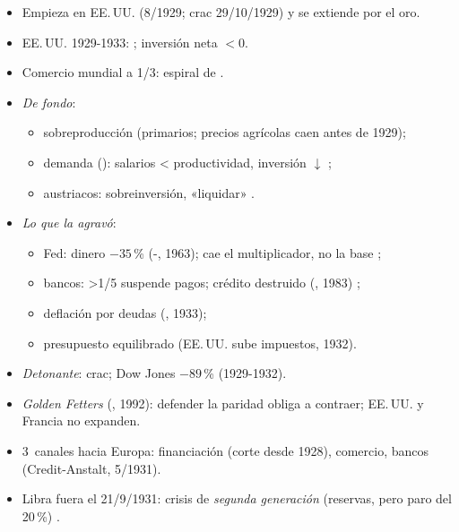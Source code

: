 \documentclass{article}
\begin{document}
\begin{columnas}
\begin{itemize}
\item Empieza en EE.\,UU. (8/1929; crac 29/10/1929) y se extiende por el oro.
\item EE.\,UU. 1929-1933: ; inversión neta $<0$.
\item Comercio mundial a 1/3: espiral de .
\end{itemize}
\begin{itemize}
\item \emph{De fondo}:
  \begin{itemize}
  \item sobreproducción (primarios; precios agrícolas caen antes de 1929);
  \item demanda (): salarios < productividad, inversión $\downarrow$ ;
  \item austriacos: sobreinversión, «liquidar» .
  \end{itemize}
\item \emph{Lo que la agravó}:
  \begin{itemize}
  \item Fed: dinero $-35$\,\% (-, 1963); cae el multiplicador, no la base ;
  \item bancos: >1/5 suspende pagos; crédito destruido (, 1983) ;
  \item deflación por deudas (, 1933);
  \item presupuesto equilibrado (EE.\,UU. sube impuestos, 1932).
  \end{itemize}
\item \emph{Detonante}: crac; Dow Jones $-89$\,\% (1929-1932).
\end{itemize}
\begin{itemize}
\item \emph{Golden Fetters} (, 1992): defender la paridad obliga a contraer; EE.\,UU. y Francia no expanden.
\item 3~canales hacia Europa: financiación (corte desde 1928), comercio, bancos (Credit-Anstalt, 5/1931).
\item Libra fuera el 21/9/1931: crisis de \emph{segunda generación} (reservas, pero paro del 20\,\%) .
\end{itemize}

\end{columnas}
\end{document}
